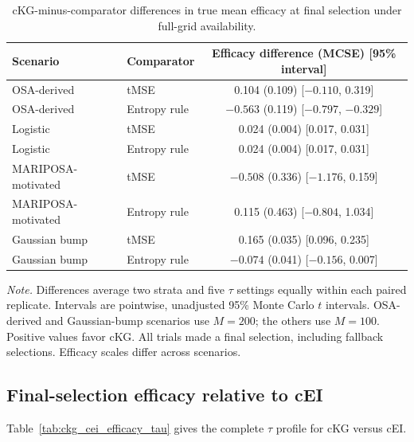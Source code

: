 \documentclass[11pt]{article}
\newcommand{\revisioncolor}{}
\begin{document}
\begin{table}[H]
\revisioncolor
\centering\footnotesize
\caption{cKG-minus-comparator differences in true mean efficacy at final selection under full-grid availability.}
\label{tab:efficacy_comparators}
\begin{tabular}{@{}llc@{}}
\toprule
Scenario & Comparator & Efficacy difference (MCSE) [95\% interval]\\
\midrule
OSA-derived & tMSE & 0.104 (0.109) [$-0.110$, 0.319] \\
OSA-derived & Entropy rule & $-0.563$ (0.119) [$-0.797$, $-0.329$] \\
Logistic & tMSE & 0.024 (0.004) [0.017, 0.031] \\
Logistic & Entropy rule & 0.024 (0.004) [0.017, 0.031] \\
MARIPOSA-motivated & tMSE & $-0.508$ (0.336) [$-1.176$, 0.159] \\
MARIPOSA-motivated & Entropy rule & 0.115 (0.463) [$-0.804$, 1.034] \\
Gaussian bump & tMSE & 0.165 (0.035) [0.096, 0.235] \\
Gaussian bump & Entropy rule & $-0.074$ (0.041) [$-0.156$, 0.007] \\
\bottomrule
\end{tabular}
\vspace{3pt}
\begin{minipage}{0.98\linewidth}\scriptsize\raggedright
\textit{Note.} Differences average two strata and five $\tau$ settings equally within each paired replicate. Intervals are pointwise, unadjusted 95\% Monte Carlo $t$ intervals. OSA-derived and Gaussian-bump scenarios use $M=200$; the others use $M=100$. Positive values favor cKG. All trials made a final selection, including fallback selections. Efficacy scales differ across scenarios.
\end{minipage}
\end{table}

\subsection{Final-selection efficacy relative to cEI}\label{sec:ckg_cei_tau}

Table~\ref{tab:ckg_cei_efficacy_tau} gives the complete $\tau$ profile for cKG versus cEI.
\end{document}
